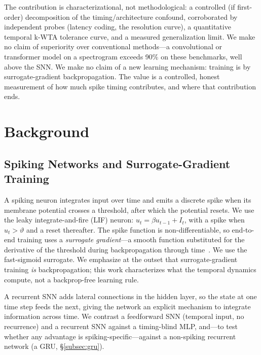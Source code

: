 \documentclass[11pt]{article}
\begin{document}
The contribution is characterizational, not methodological: a controlled (if first-order) decomposition of the timing/architecture confound, corroborated by independent probes (latency coding, the resolution curve), a quantitative temporal k-WTA tolerance curve, and a measured generalization limit. We make no claim of superiority over conventional methods---a convolutional or transformer model on a spectrogram exceeds 90\% on these benchmarks, well above the SNN. We make no claim of a new learning mechanism: training is by surrogate-gradient backpropagation. The value is a controlled, honest measurement of how much spike timing contributes, and where that contribution ends.

\section{Background}
\label{sec:background}

\subsection{Spiking Networks and Surrogate-Gradient Training}
A spiking neuron integrates input over time and emits a discrete spike when its membrane potential crosses a threshold, after which the potential resets. We use the leaky integrate-and-fire (LIF) neuron: $u_t = \beta u_{t-1} + I_t$, with a spike when $u_t > \vartheta$ and a reset thereafter. The spike function is non-differentiable, so end-to-end training uses a \emph{surrogate gradient}---a smooth function substituted for the derivative of the threshold during backpropagation through time~\citep{neftci2019surrogate}. We use the fast-sigmoid surrogate. We emphasize at the outset that surrogate-gradient training \emph{is} backpropagation; this work characterizes what the temporal dynamics compute, not a backprop-free learning rule.

A recurrent SNN adds lateral connections in the hidden layer, so the state at one time step feeds the next, giving the network an explicit mechanism to integrate information across time. We contrast a feedforward SNN (temporal input, no recurrence) and a recurrent SNN against a timing-blind MLP, and---to test whether any advantage is spiking-specific---against a non-spiking recurrent network (a GRU, \S\ref{subsec:gru}).
\end{document}
